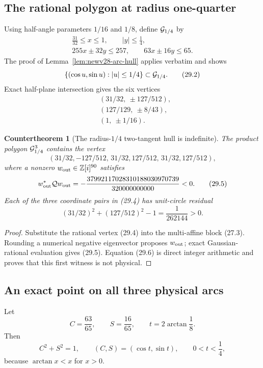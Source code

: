 \documentclass[11pt,oneside]{article}
\newtheorem{countertheorem}[theorem]{Countertheorem}
\theoremstyle{definition}
\theoremstyle{remark}
\begin{document}
\subsection{The rational polygon at radius one-quarter}

Using half-angle parameters \(1/16\) and \(1/8\), define
\({\cal G}_{1/4}\) by
\[
\begin{gathered}
 \frac{31}{32}\le x\le1,\qquad |y|\le\frac14,\\
 255x\pm32y\le257,\qquad 63x\pm16y\le65.                \tag{29.1}
\end{gathered}
\]
The proof of Lemma~\ref{lem:newv28-arc-hull} applies verbatim and
shows
\[
 \{(\cos u,\sin u):|u|\le1/4\}\subset{\cal G}_{1/4}.     \tag{29.2}
\]
Exact half-plane intersection gives the six vertices
\[
\begin{split}
 &(31/32,\ \pm127/512),\\
 &(127/129,\ \pm8/43),\\
 &(1,\ \pm1/16).
\end{split}                                             \tag{29.3}
\]

\begin{countertheorem}[The radius-\(1/4\) two-tangent hull is indefinite]
\label{ctr:newv29-polygon}
The product polygon \({\cal G}_{1/4}^3\) contains the vertex
\[
 (31/32,-127/512,\,
   31/32,127/512,\,
   31/32,127/512),                                      \tag{29.4}
\]
where a nonzero \(w_{\rm out}\in\mathbb Z[i]^{90}\) satisfies
\[
 w_{\rm out}^*{\cal Q}w_{\rm out}
 =-\frac{37992117028310188030970739}{320000000000}<0.   \tag{29.5}
\]
Each of the three coordinate pairs in (29.4) has unit-circle
residual
\[
 (31/32)^2+(127/512)^2-1=\frac1{262144}>0.              \tag{29.6}
\]
\end{countertheorem}

\begin{proof}
Substitute the rational vertex (29.4) into the multi-affine block
(27.3).  Rounding a numerical negative eigenvector proposes
\(w_{\rm out}\); exact Gaussian-rational evaluation gives (29.5).
Equation (29.6) is direct integer arithmetic and proves that this
first witness is not physical.
\end{proof}

\subsection{An exact point on all three physical arcs}

Let
\[
 C=\frac{63}{65},\qquad S=\frac{16}{65},\qquad
 t=2\arctan\frac18.                                     \tag{29.7}
\]
Then
\[
 C^2+S^2=1,\qquad (C,S)=(\cos t,\sin t),\qquad
 0<t<\frac14,                                           \tag{29.8}
\]
because \(\arctan x<x\) for \(x>0\).
\end{document}
